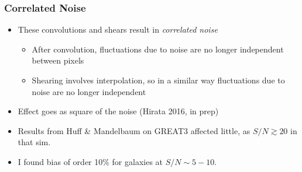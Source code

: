 \documentclass{beamer}
\begin{document}
\frame
{
    \frametitle{Correlated Noise}

 
    \begin{itemize}

        \item These convolutions and shears result in {\em {\color{brightred} correlated noise}}
            
        \begin{itemize}
            \item After convolution, fluctuations due to noise are no longer
                independent between pixels

            \item Shearing involves interpolation, so in a similar way fluctuations
                due to noise are no longer independent
        \end{itemize}

    \item Effect goes as {\color{orange} square} of the noise (Hirata 2016, in prep)

        \item Results from Huff \& Mandelbaum on GREAT3 affected little, as
            $S/N \gtrsim 20$ in that sim.

        \item I found bias of order 10\% for galaxies at $S/N \sim 5-10$.



    \end{itemize}

}


%
%
%
%
\end{document}
